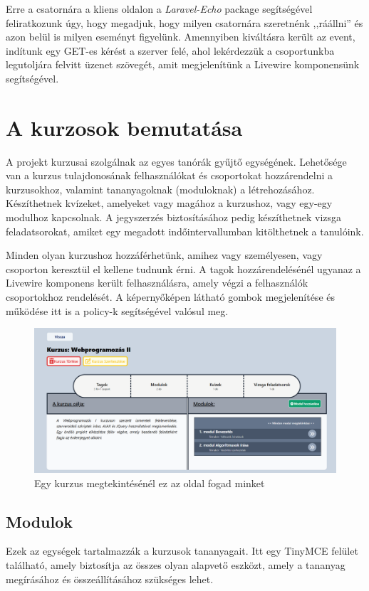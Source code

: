 \documentclass[
]{thesis-ekf}
\theoremstyle{definition}
\theoremstyle{remark}
\begin{document}
                Erre a csatornára a kliens oldalon a \emph{Laravel-Echo}\cite{Laravel-Echo} package segítségével feliratkozunk úgy, hogy megadjuk, hogy milyen csatornára szeretnénk ,,ráállni'' és azon belül is milyen eseményt figyelünk. Amennyiben kiváltásra került az event, indítunk egy GET-es kérést a szerver felé, ahol lekérdezzük a csoportunkba legutoljára felvitt üzenet szövegét, amit megjelenítünk a Livewire komponensünk segítségével.
                
        \chapter{A kurzosok bemutatása}\label{Kurzusok-bemutat}
            A projekt kurzusai szolgálnak az egyes tanórák gyűjtő egységének. Lehetősége van a kurzus tulajdonosának felhasználókat és csoportokat hozzárendelni a kurzusokhoz, valamint tananyagoknak (moduloknak) a létrehozásához. Készíthetnek kvízeket, amelyeket vagy magához a kurzushoz, vagy egy-egy modulhoz kapcsolnak. A jegyszerzés biztosításához pedig készíthetnek vizsga feladatsorokat, amiket egy megadott indőintervallumban kitölthetnek a tanulóink.

            Minden olyan kurzushoz hozzáférhetünk, amihez vagy személyesen, vagy csoporton keresztül el kellene tudnunk érni. A tagok hozzárendelésénél ugyanaz a Livewire komponens került felhasználásra, amely végzi a felhasználók csoportokhoz rendelését. A képernyőképen látható gombok megjelenítése és működése itt is a policy-k segítségével valósul meg.
            \begin{figure}[ht!]
    		\centering
    		\includegraphics[width=15cm]{Courses.show.png}
                \caption{Egy kurzus megtekintésénél ez az oldal fogad minket}
    		\label{fig-kurzusok-show}
    	\end{figure}
     
            \section{Modulok}
            Ezek az egységek tartalmazzák a kurzusok tananyagait. Itt egy TinyMCE felület található, amely biztosítja az összes olyan alapvető eszközt, amely a tananyag megírásához és összeállításához szükséges lehet.
            
\end{document}
